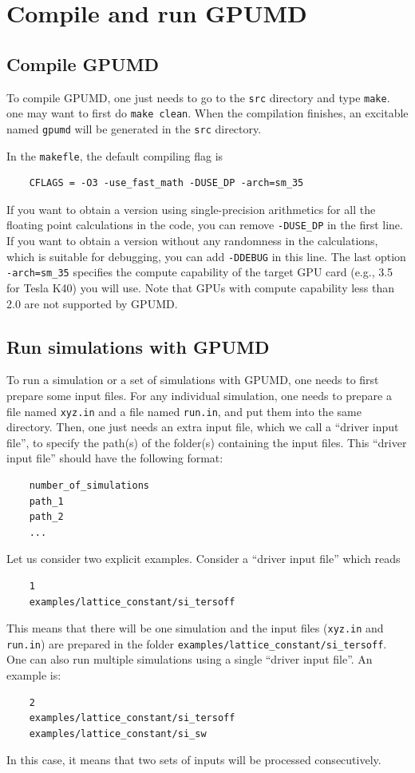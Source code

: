 \documentclass[12pt,a4paper]{report}
\begin{document}
\section{Compile and run GPUMD}

\subsection{Compile GPUMD}

To compile GPUMD, one just needs to go to the \verb"src" directory and type \verb"make". one may want to first do \verb"make clean". When the compilation finishes, an excitable named \verb"gpumd" will be generated in the \verb"src" directory.

In the \verb"makefle", the default compiling flag is
\begin{verbatim}
    CFLAGS = -O3 -use_fast_math -DUSE_DP -arch=sm_35
\end{verbatim}
If you want to obtain a version using single-precision arithmetics for all the floating point calculations in the code, you can remove \verb"-DUSE_DP" in the first line. If you want to obtain a version without any randomness in the calculations, which is suitable for debugging, you can add \verb"-DDEBUG" in this line. The last option \verb"-arch=sm_35" specifies the compute capability of the target GPU card (e.g., 3.5 for Tesla K40) you will use. Note that GPUs with compute capability less than 2.0 are not supported by GPUMD.

\subsection{Run simulations with GPUMD}

To run a simulation or a set of simulations with GPUMD, one needs to first prepare some input files. For any individual simulation, one needs to prepare a file named \verb"xyz.in" and a file named \verb"run.in", and put them into the same directory. Then, one just needs an extra input file, which we call a ``driver input file'', to specify the path(s) of the folder(s) containing the input files. This ``driver input file'' should have the following format:
\begin{verbatim}
    number_of_simulations
    path_1
    path_2
    ...
\end{verbatim}


Let us consider two explicit examples. Consider a ``driver input file'' which reads
\begin{verbatim}
    1
    examples/lattice_constant/si_tersoff
\end{verbatim}
This means that there will be one simulation and the input files (\verb"xyz.in" and \verb"run.in") are prepared in the folder \verb"examples/lattice_constant/si_tersoff". One can also run multiple simulations using a single ``driver input file''. An example is:
\begin{verbatim}
    2
    examples/lattice_constant/si_tersoff
    examples/lattice_constant/si_sw
\end{verbatim}
In this case, it means that two sets of inputs will be processed consecutively.
\end{document}
